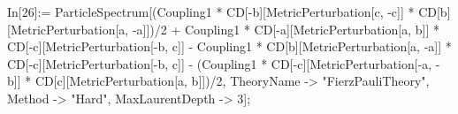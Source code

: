 In[26]:= ParticleSpectrum[(Coupling1 * CD[-b][MetricPerturbation[c, -c]] * CD[b][MetricPerturbation[a, -a]])/2 + Coupling1 * CD[-a][MetricPerturbation[a, b]] * CD[-c][MetricPerturbation[-b, c]] - Coupling1 * CD[b][MetricPerturbation[a, -a]] * CD[-c][MetricPerturbation[-b, c]] - (Coupling1 * CD[-c][MetricPerturbation[-a, -b]] * CD[c][MetricPerturbation[a, b]])/2, TheoryName -> "FierzPauliTheory", Method -> "Hard", MaxLaurentDepth -> 3]; 